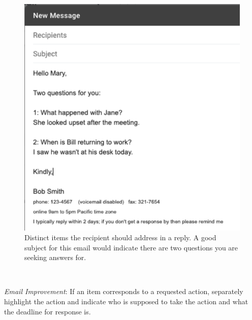 \begin{figure}%
\includegraphics[width=1\textwidth]{images/email_two_questions.pdf}
\caption{Distinct items the recipient should address in a reply. A good subject for this email would indicate there are two questions you are seeking answers for.}
\label{fig:email_two_questions}
\end{figure}

\ \\
\begin{samepage}
\textit{Email Improvement}: If an item corresponds to a requested action, separately highlight the action and indicate who is supposed to take the action and what the deadline for response is.
\end{samepage}

